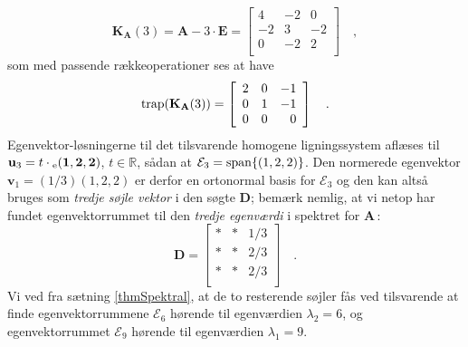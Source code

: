 \begin{example}
\begin{equation}
\mathbf{K}_{\mathbf{A}}(3) = \mathbf{A} - 3\cdot\mathbf{E} = \left[
                                          \begin{array}{rrr}
                                           4  & -2  & 0 \\
                                            -2 &  3 &  -2\\
                                            0 &  -2 & 2 \\
                                          \end{array}
                                        \right] \quad ,
\end{equation}
som med passende rækkeoperationer ses at have
\begin{equation}
\mathrm{trap}(\mathbf{K}_{\mathbf{A}}(3)) = \left[
                                          \begin{array}{rrr}
                                            2 &  0 & -1 \\
                                            0 & 1 & -1 \\
                                            0 & 0& 0 \\
                                          \end{array}
                                        \right] \quad .
\end{equation}
Egenvektor-løsningerne til det tilsvarende homogene ligningssystem aflæses til $\mathbf{u}_{3} = t\cdot{_\mathrm{e}\mathbf{(1, 2,2)}}$, $t \in \mathbb{R}$, sådan at $\mathcal{E}_{3}= \mathrm{span}\{(1,2,2)\}$. Den normerede egenvektor $\mathbf{v}_{1} = (1/3)(1, 2, 2)$ er derfor en ortonormal basis for $\mathcal{E}_{3}$ og den kan altså bruges som {\textit{tredje søjle vektor}} i den søgte $\mathbf{D}$; bemærk nemlig, at vi netop har fundet egenvektorrummet til den {\textit{tredje egenværdi}} i spektret for $\mathbf{A}$\,:
\begin{equation}
\mathbf{D}= \left[
          \begin{array}{rrr}
            * & * & 1/3 \\
            * & * & 2/3 \\
            * & * & 2/3 \\
          \end{array}
        \right] \quad .
\end{equation}
Vi ved fra sætning \ref{thmSpektral}, at de to resterende søjler fås ved tilsvarende at finde  egenvektorrummene $\mathcal{E}_{6}$  hørende til egenværdien $\lambda_{2} = 6$, og egenvektorrummet $\mathcal{E}_{9}$  hørende til egenværdien $\lambda_{1} = 9$.\\


\end{example}

